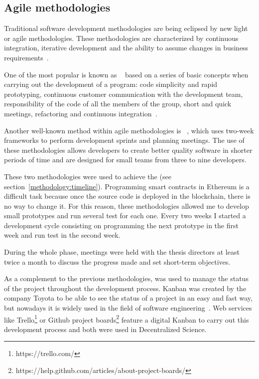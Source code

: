 \subsection{Agile methodologies}
\label{sec:agile-methodologies}

Traditional software development methodologies are being eclipsed by new light
or agile methodologies. These methodologies are characterized by continuous
integration, iterative development and the ability to assume changes in business
requirements~\cite{boehm2005management,livermore2008factors}.

One of the most popular is known as ~\cite{lindstrom2004extreme} based on a series of basic concepts
when carrying out the development of a program: code simplicity and rapid
prototyping, continuous customer communication with the development team,
responsibility of the code of all the members of the group, short and quick
meetings, refactoring and continuous integration~\cite{theunissen2005search}.

Another well-known method within agile methodologies is
~\cite{rising2000scrum}, which uses two-week frameworks to perform
development sprints and planning meetings. The use of these methodologies allows
developers to create better quality software in shorter periods of time and are
designed for small teams from three to nine developers.

These two methodologies were used to achieve the 
(see section~\ref{methodology:timeline}). Programming smart contracts in
Ethereum is a difficult task because once the source code is deployed in the
blockchain, there is no way to change it. For this reason, these methodologies
allowed me to develop small prototypes and run several test for each one. Every
two weeks I started a development cycle consisting on programming the next
prototype in the first week and run test in the second week.

During the whole  phase, meetings were held with the
thesis directors at least twice a month to discuss the progress made and set
short-term objectives.

As a complement to the previous methodologies,  was used to manage
the status of the project throughout the development process. Kanban was created
by the company Toyota to be able to see the status of a project in an easy and
fast way, but nowadays it is widely used in the field of software
engineering~\cite{ahmad2013kanban}. Web services like
Trello\footnote{https://trello.com/} or Github project
boards\footnote{https://help.github.com/articles/about-project-boards/} feature
a digital Kanban to carry out this development process and both were used in
Decentralized Science.

